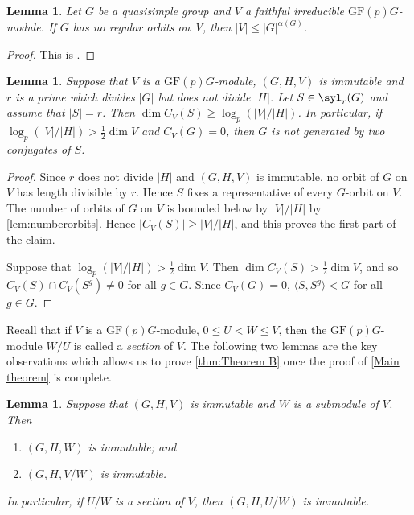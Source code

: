 \documentclass[12pt]{amsart}
\newtheorem{lemma}[theorem]{Lemma}
\theoremstyle{remark}
\theoremstyle{notation}
\theoremstyle{definition}
\newcommand{\GF}{\mathrm{GF}}
\newcommand{\0}{\emptyset}
\begin{document}
\begin{lemma}\label{lem:dimbound}
  Let  $G$ be  a      quasisimple  group  and  $V$ a  faithful  irreducible $\GF(p)G$-module.
 If $G$  has no regular orbits on V, then $|V| \le |G|^{\alpha(G)}$.
 \end{lemma}

\begin{proof}
This is \cite[Lemma 3.5]{FOS}.
\end{proof}



\begin{lemma}\label{SU2nhelp}
Suppose that $V$ is a $\GF(p)G$-module, $(G,H,V)$ is immutable and $r$ is a prime which divides $|G|$ but does not divide $|H|$. Let $S\in \syl_r(G)$ and assume that $|S|=r$.  Then $\dim C_V(S) \ge \log_p(|V|/|H|)$. In particular, if $\log_p(|V|/|H|)> \frac 12 \dim V$ and $C_V(G)=0$, then $G$ is not generated by two conjugates of $S$.
\end{lemma}

 \begin{proof}
 Since $ r$ does not divide $|H|$ and $(G,H,V)$ is immutable, no orbit of $G$ on $V$ has length divisible by $r$.  Hence $S$ fixes a representative of every $G$-orbit  on $V$.  The number of orbits of $G$ on $V$ is bounded below by $|V|/|H|$ by \cref{lem:numberorbits}. Hence $|C_V(S)| \ge |V|/|H|$, and this proves the first part of the claim.

 Suppose that $\log_p(|V|/|H|)> \frac 12 \dim V$. Then $\dim C_V(S)> \frac 12 \dim V$, and so $C_V(S) \cap C_V(S^g) \ne 0$ for all $g \in G$.  Since $C_V(G)=0$, $\langle S,S^g\rangle <G$ for all $g \in G$.
 \end{proof}


Recall that if $V$ is a $\GF(p)G$-module, $0\le U<W \le V$, then the $\GF(p)G$-module  $W/U$ is called a \emph{section} of $V$. The following two  lemmas are the key observations which allows us to prove \cref{thm:Theorem B} once the proof of \cref{Main theorem} is complete.



\begin{lemma}\label{lem: reduct to irred}   Suppose that $(G,H,V)$ is immutable and $W$ is a submodule of $V$. Then
 \begin{enumerate}
 \item  $(G ,H  ,W)$ is immutable; and
\item $(G,H  ,V/W)$ is immutable.
\end{enumerate}
In particular, if $U/W$ is a section of $V$, then $(G,H,U/W)$ is immutable.
\end{lemma}
\end{document}
